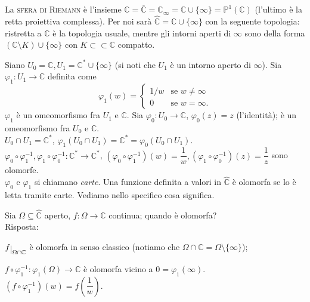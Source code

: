 \begin{defn}
  La \textsc{sfera di Riemann} è l'insieme $\hat{\mathbb{C}}=\overline{\mathbb{C}}=\mathbb{C}_{\infty}=\mathbb{C} \cup \{\infty\}=\mathbb{P}^1(\mathbb{C})$ (l'ultimo è la retta proiettiva complessa).
  Per noi sarà $\hat{\mathbb{C}}=\mathbb{C} \cup \{\infty\}$ con la seguente topologia: ristretta a $\mathbb{C}$ è la topologia usuale, mentre gli intorni aperti di $\infty$ sono della forma $(\mathbb{C} \setminus K) \cup \{\infty\}$ con $K \subset \subset \mathbb{C}$ compatto.
\end{defn}

Siano $U_0=\mathbb{C}, U_1=\mathbb{C}^*\cup\{\infty\}$ (si noti che $U_1$ è un intorno aperto di $\infty$). Sia $\varphi_1:U_1 \rightarrow \mathbb{C}$ definita come
$$\varphi_1(w)=\begin{cases} 1/w & \mbox{se }w\not=\infty \\ 0 & \mbox{se }w=\infty. \end{cases}$$
$\varphi_1$ è un omeomorfismo fra $U_1$ e $\mathbb{C}$.
Sia $\varphi_0:U_0 \rightarrow \mathbb{C}$, $\varphi_0(z)=z$ (l'identità); è un omeomorfismo fra $U_0$ e $\mathbb{C}$. \\
$U_0 \cap U_1=\mathbb{C}^*$, $\varphi_1(U_0 \cap U_1)=\mathbb{C}^*=\varphi_0(U_0 \cap U_1)$. \\
$\varphi_0 \circ \varphi_1^{-1}, \varphi_1 \circ \varphi_0^{-1}:\mathbb{C}^* \rightarrow \mathbb{C}^*$,
$(\varphi_0 \circ \varphi_1^{-1})(w)=\dfrac{1}{w}, (\varphi_1 \circ \varphi_0^{-1})(z)=\dfrac{1}{z}$ sono olomorfe. \\
$\varphi_0$ e $\varphi_1$ si chiamano \textit{carte}. Una funzione definita a valori in $\hat{\mathbb{C}}$ è olomorfa se lo è letta tramite carte. Vediamo nello specifico cosa significa.

Sia $\Omega \subseteq \hat{\mathbb{C}}$ aperto, $f:\Omega \rightarrow \mathbb{C}$ continua; quando è olomorfa? \\
Risposta:
\begin{nlist}
  \item $f \restrict{\Omega \cap \mathbb{C}}$ è olomorfa in senso classico (notiamo che $\Omega \cap \mathbb{C}=\Omega \setminus \{\infty\}$);
  \item $f \circ \varphi_1^{-1}:\varphi_1(\Omega) \rightarrow \mathbb{C}$ è olomorfa vicino a $0=\varphi_1(\infty)$. \\
  $(f \circ \varphi_1^{-1})(w)=f\left(\dfrac{1}{w}\right)$.
\end{nlist}

